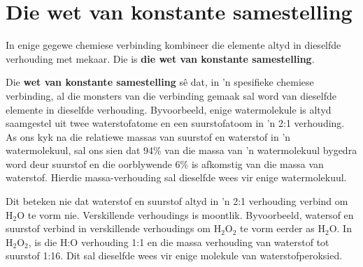             \section{Die wet van konstante samestelling}
            \nopagebreak
      \label{m38711*id65065}In enige gegewe chemiese verbinding kombineer die elemente altyd in dieselfde verhouding met mekaar. Die is \textbf{die wet van konstante samestelling}.\par 
\label{m38711*id65075}Die \textbf{wet van konstante samestelling} s\^{e} dat, in 'n spesifieke chemiese verbinding, al die monsters
van die verbinding gemaak sal word van dieselfde elemente in dieselfde verhouding. Byvoorbeeld, enige watermolekule is
altyd saamgestel uit twee waterstofatome en een suurstofatoom in 'n 2:1 verhouding. As ons kyk na die relatiewe massas van suurstof en waterstof in 'n watermolekuul, sal ons sien dat 94\% van die massa van 'n watermolekuul bygedra word deur suurstof en die oorblywende 6\% is afkomstig van die massa van waterstof. Hierdie massa-verhouding sal dieselfde wees vir enige watermolekuul.\par 
      \label{m38711*id65089}Dit beteken nie dat waterstof en suurstof altyd in 'n 2:1 verhouding verbind om $\text{H}{}_{2}\text{O}$ te vorm nie. Verskillende verhoudings is moontlik. Byvoorbeeld, watersof en suurstof verbind in verskillende verhoudings om $\text{H}{}_{2}\text{O}{}_{2}$ te vorm eerder as $\text{H}{}_{2}\text{O}$. In $\text{H}{}_{2}\text{O}{}_{2}$, is die H:O verhouding 1:1 en die massa verhouding van waterstof tot suurstof 1:16. Dit sal dieselfde wees vir enige molekule van waterstofperoksied.\par 
